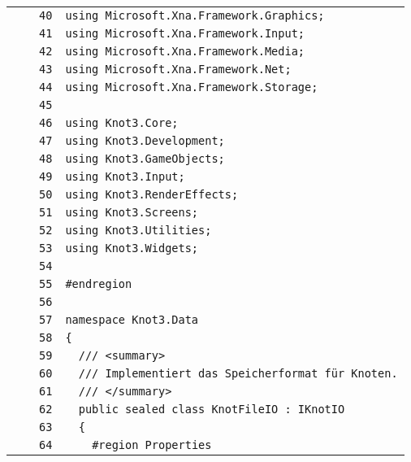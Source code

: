 \documentclass[a4paper,10pt]{article}
\begin{document}
\begin{longtable}[l]{lrrl}
\cellcolor{gray} &  & \verb~40~ & \verb~using Microsoft.Xna.Framework.Graphics;~\\
\cellcolor{gray} &  & \verb~41~ & \verb~using Microsoft.Xna.Framework.Input;~\\
\cellcolor{gray} &  & \verb~42~ & \verb~using Microsoft.Xna.Framework.Media;~\\
\cellcolor{gray} &  & \verb~43~ & \verb~using Microsoft.Xna.Framework.Net;~\\
\cellcolor{gray} &  & \verb~44~ & \verb~using Microsoft.Xna.Framework.Storage;~\\
\cellcolor{gray} &  & \verb~45~ & \verb~~\\
\cellcolor{gray} &  & \verb~46~ & \verb~using Knot3.Core;~\\
\cellcolor{gray} &  & \verb~47~ & \verb~using Knot3.Development;~\\
\cellcolor{gray} &  & \verb~48~ & \verb~using Knot3.GameObjects;~\\
\cellcolor{gray} &  & \verb~49~ & \verb~using Knot3.Input;~\\
\cellcolor{gray} &  & \verb~50~ & \verb~using Knot3.RenderEffects;~\\
\cellcolor{gray} &  & \verb~51~ & \verb~using Knot3.Screens;~\\
\cellcolor{gray} &  & \verb~52~ & \verb~using Knot3.Utilities;~\\
\cellcolor{gray} &  & \verb~53~ & \verb~using Knot3.Widgets;~\\
\cellcolor{gray} &  & \verb~54~ & \verb~~\\
\cellcolor{gray} &  & \verb~55~ & \verb~#endregion~\\
\cellcolor{gray} &  & \verb~56~ & \verb~~\\
\cellcolor{gray} &  & \verb~57~ & \verb~namespace Knot3.Data~\\
\cellcolor{gray} &  & \verb~58~ & \verb~{~\\
\cellcolor{gray} &  & \verb~59~ & \verb~  /// <summary>~\\
\cellcolor{gray} &  & \verb~60~ & \verb~  /// Implementiert das Speicherformat für Knoten.~\\
\cellcolor{gray} &  & \verb~61~ & \verb~  /// </summary>~\\
\cellcolor{gray} &  & \verb~62~ & \verb~  public sealed class KnotFileIO : IKnotIO~\\
\cellcolor{gray} &  & \verb~63~ & \verb~  {~\\
\cellcolor{gray} &  & \verb~64~ & \verb~    #region Properties~\\

\end{longtable}
\end{document}

